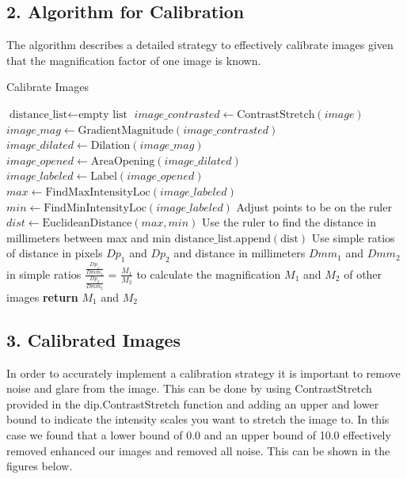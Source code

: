 \documentclass{article}
\begin{document}
\subsection*{2. Algorithm for Calibration}
The algorithm describes a detailed strategy to effectively calibrate images given that the magnification factor of one image is known.

\begin{algorithm}[h!]
\caption{Calibrate Images}\label{calibration_algo}
\begin{algorithmic}[1]
    \State $\text{distance\_list} \gets \text{empty list}$
        \State $image\_contrasted \gets \text{ContrastStretch}(image)$
        \State $image\_mag \gets \text{GradientMagnitude}(image\_contrasted)$
        \State $image\_dilated \gets \text{Dilation}(image\_mag)$
        \State $image\_opened \gets \text{AreaOpening}(image\_dilated)$
        \State $image\_labeled \gets \text{Label}(image\_opened)$
        \State $max \gets \text{FindMaxIntensityLoc}(image\_labeled)$
        \State $min \gets \text{FindMinIntensityLoc}(image\_labeled)$
        \State Adjust points to be on the ruler 
        \State $dist \gets \text{EuclideanDistance}(max, min)$
        \State Use the ruler to find the distance in millimeters between max and min
        \State $\text{distance\_list}.\text{append}(\text{dist})$
    \EndFor
    \State Use simple ratios of distance in pixels ${Dp_{1}}$ and ${Dp_{2}}$ and distance in millimeters $Dmm_{1}$ and $Dmm_{2}$ in simple ratios $\frac{\frac{Dp_{1}}{Dmm_{1}}}{\frac{Dp_{2}}{Dmm_{2}}}$ = $\frac{M_1}{M_2}$ to calculate the magnification $M_1$ and $M_2$ of other images 
    \State \textbf{return} $M_1$ and $M_2$
\EndProcedure
\end{algorithmic}
\end{algorithm}


\subsection*{3. Calibrated Images}
In order to accurately implement a calibration strategy it is important to remove noise and glare from the image. This can be done by using ContrastStretch provided in the dip.ContrastStretch function and adding an upper and lower bound to indicate the intensity scales you want to stretch the image to. In this case we found that a lower bound of 0.0 and an upper bound of 10.0 effectively removed enhanced our images and removed all noise. This can be shown in the figures below. \newline 
\end{document}
